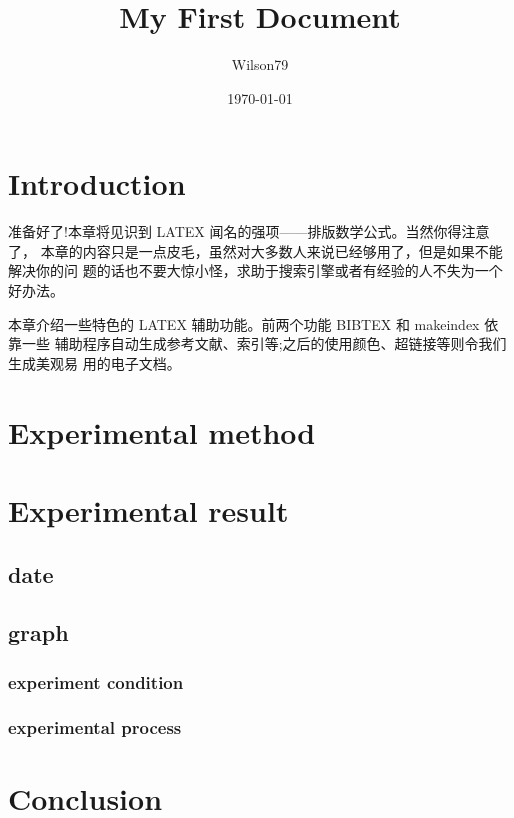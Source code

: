 \documentclass{article}
\title{My First Document}
\author{Wilson79}
\date{\today}
\begin{document}
 
	\tableofcontents %
	\maketitle %

	\section{Introduction} 
	准备好了!本章将见识到 LATEX 闻名的强项——排版数学公式。当然你得注意了， 本章的内容只是一点皮毛，虽然对大多数人来说已经够用了，但是如果不能解决你的问 题的话也不要大惊小怪，求助于搜索引擎或者有经验的人不失为一个好办法。
	
	本章介绍一些特色的 LATEX 辅助功能。前两个功能 BIBTEX 和 makeindex 依靠一些 辅助程序自动生成参考文献、索引等;之后的使用颜色、超链接等则令我们生成美观易 用的电子文档。 

	\section{Experimental method} %

	\section{Experimental result}
	\subsection{date} %
	\subsection{graph} %
	\subsubsection{experiment condition} %
	\subsubsection{experimental process} %

	\section{Conclusion}
\end{document}
